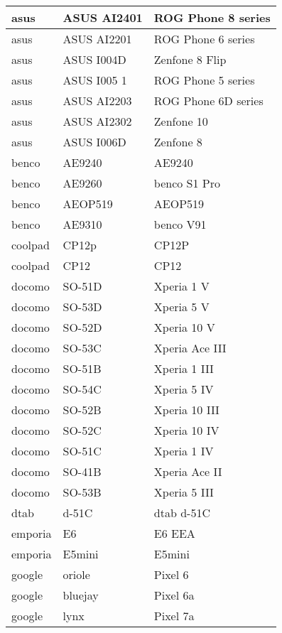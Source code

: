 \begin{tabularx}{\linewidth}{|l|X|X|}
        asus & ASUS AI2401 & ROG Phone 8 series \\ \hline
        asus & ASUS AI2201 & ROG Phone 6 series \\ \hline
        asus & ASUS I004D & Zenfone 8 Flip \\ \hline
        asus & ASUS I005 1 & ROG Phone 5 series \\ \hline
        asus & ASUS AI2203 & ROG Phone 6D series \\ \hline
        asus & ASUS AI2302 & Zenfone 10 \\ \hline
        asus & ASUS I006D & Zenfone 8 \\ \hline
        benco & AE9240 & AE9240 \\ \hline
        benco & AE9260 & benco S1 Pro \\ \hline
        benco & AEOP519 & AEOP519 \\ \hline
        benco & AE9310 & benco V91 \\ \hline
        coolpad & CP12p & CP12P \\ \hline
        coolpad & CP12 & CP12 \\ \hline
        docomo & SO-51D & Xperia 1 V \\ \hline
        docomo & SO-53D & Xperia 5 V \\ \hline
        docomo & SO-52D & Xperia 10 V \\ \hline
        docomo & SO-53C & Xperia Ace III \\ \hline
        docomo & SO-51B & Xperia 1 III \\ \hline
        docomo & SO-54C & Xperia 5 IV \\ \hline
        docomo & SO-52B & Xperia 10 III \\ \hline
        docomo & SO-52C & Xperia 10 IV \\ \hline
        docomo & SO-51C & Xperia 1 IV \\ \hline
        docomo & SO-41B & Xperia Ace II \\ \hline
        docomo & SO-53B & Xperia 5 III \\ \hline
        dtab & d-51C & dtab d-51C \\ \hline
        emporia & E6 & E6 EEA \\ \hline
        emporia & E5mini & E5mini \\ \hline
        google & oriole & Pixel 6 \\ \hline
        google & bluejay & Pixel 6a \\ \hline
        google & lynx & Pixel 7a \\ \hline

\end{tabularx}
